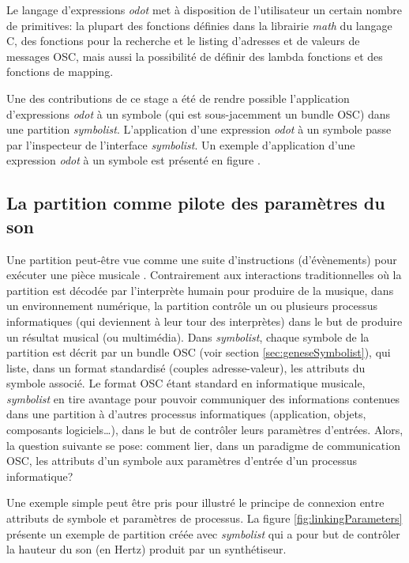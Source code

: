 Le langage d'expressions \textit{odot} met à disposition de l'utilisateur un certain nombre de primitives: la plupart des fonctions définies dans la librairie \textit{math} du langage C, des fonctions pour la recherche et le listing d'adresses et de valeurs de messages OSC, mais aussi la possibilité de définir des lambda fonctions et des fonctions de mapping.

Une des contributions de ce stage a été de rendre possible l'application d'expressions \textit{odot} à un symbole (qui est sous-jacemment un bundle OSC) dans une partition \textit{symbolist}. L'application d'une expression \textit{odot} à un symbole passe par l'inspecteur de l'interface \textit{symbolist}. Un exemple d'application d'une expression \textit{odot} à un symbole est présenté en figure .

\subsection{La partition comme pilote des paramètres du son} 
\label{subsec:partitionPiloteSon}
Une partition peut-être vue comme une suite d'instructions (d'évènements) pour exécuter une pièce musicale \cite{bosseur2005}. Contrairement aux interactions traditionnelles où la partition est décodée par l'interprète humain pour produire de la musique, dans un environnement numérique, la partition contrôle un ou plusieurs processus informatiques (qui deviennent à leur tour des interprètes) dans le but de produire un résultat musical (ou multimédia).
Dans \textit{symbolist}, chaque symbole de la partition est décrit par un bundle OSC (voir section \ref{sec:geneseSymbolist}), qui liste, dans un format standardisé (couples adresse-valeur), les attributs du symbole associé.
Le format OSC étant standard en informatique musicale, \textit{symbolist} en tire avantage pour pouvoir communiquer des informations contenues dans une partition à d'autres processus informatiques (application, objets, composants logiciels…), dans le but de contrôler leurs paramètres d'entrées.
Alors, la question suivante se pose: comment lier, dans un paradigme de communication OSC, les attributs d'un symbole aux paramètres d'entrée d'un processus informatique?

Une exemple simple peut être pris pour illustré le principe de connexion entre attributs de symbole et paramètres de processus. La figure \ref{fig:linkingParameters} présente un exemple de partition créée avec \textit{symbolist} qui a pour but de contrôler la hauteur du son (en Hertz) produit par un synthétiseur.

